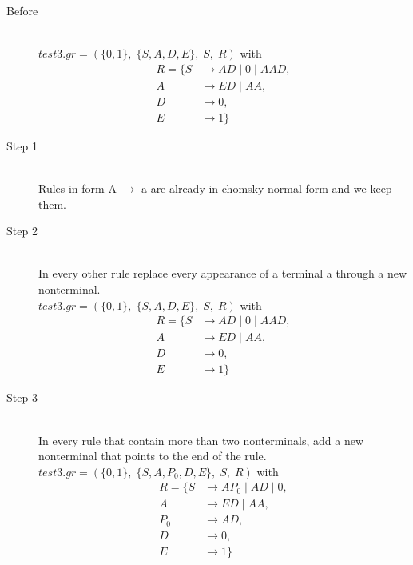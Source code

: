 \documentclass{article}
\begin{document}
\begin{description}
	\item[Before] \hfill \\ 
		$test3.gr=(\{	0, 1\},\;\{ S, A, D, E\},\;S,\;R)$ with
	\begin{align*}
		R=\{	S &\rightarrow AD\;|\;0\;|\;AAD, \\ 
		A &\rightarrow ED\;|\;AA, \\ 
		D &\rightarrow 0, \\ 
		E &\rightarrow 1\}
	\end{align*}
	\item[Step 1] \hfill \\ 
	Rules in form A  $\rightarrow$  a are already in chomsky normal form and we keep them.\\ 
		\item[Step 2] \hfill \\ 
	In every other rule replace every appearance of a terminal a through a new nonterminal.\\ 
	$test3.gr=(\{	0, 1\},\;\{ S, A, D, E\},\;S,\;R)$ with
	\begin{align*}
		R=\{	S &\rightarrow AD\;|\;0\;|\;AAD, \\ 
		A &\rightarrow ED\;|\;AA, \\ 
		D &\rightarrow 0, \\ 
		E &\rightarrow 1\}
	\end{align*}
	\item[Step 3] \hfill \\ 
	In every rule that contain more than two nonterminals, add a new nonterminal that points to the end of the rule.\\ 
	$test3.gr=(\{	0, 1\},\;\{ S, A, P_{0}, D, E\},\;S,\;R)$ with
	\begin{align*}
		R=\{	S &\rightarrow AP_{0} \;|\;AD\;|\;0, \\ 
		A &\rightarrow ED\;|\;AA, \\ 
		P_{0}  &\rightarrow AD, \\ 
		D &\rightarrow 0, \\ 
		E &\rightarrow 1\}
	\end{align*}
\end{description}
\end{document}

